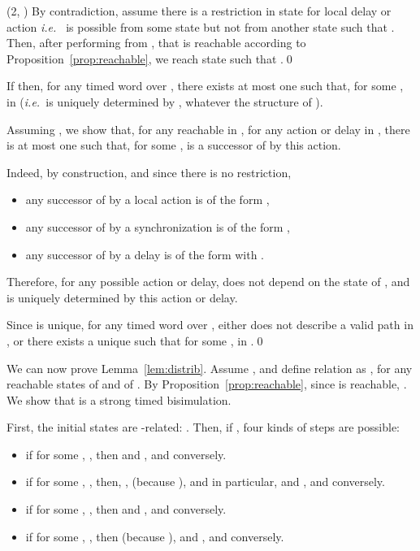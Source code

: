 \documentclass{LMCS}
\theoremstyle{plain}\newtheorem*{prop11}{Proposition~\ref{prop:states} bis}
\def\ie{{\em i.e.\ }}
\begin{document}
  (2, ) By contradiction, assume there is a restriction in state  for
  local delay or action  \ie
   is possible from some state  but not from another state
   such that . Then, after performing  from
  , that is reachable according to
  Proposition~\ref{prop:reachable}, we reach state  such
  that .\qed

\begin{prop}\label{prop:uniqueness}
  If  then,
  for any timed word  over , there exists at most one  such that, for some ,
   in 
  (\ie  is uniquely determined by , whatever the structure of
  ).
\end{prop}
\proof Assuming , we show that, for any  reachable
in , for any action or delay in
,
there is at most one  such that, for some ,  is a
successor of  by this action.

Indeed, by construction, and since there is no restriction,
\begin{itemize}
  \item any successor of  by a local action is of the form
  ,
  \item any successor of  by a synchronization  is
  of the form ,
  \item any successor of  by a delay  is
  of the form  with .
\end{itemize}
Therefore, for any possible action or delay,  does not depend on the
state of , and is uniquely determined by this action or delay.

Since  is unique, for any timed word  over
, either  does not
describe a valid path in , or there exists a unique 
such that for some ,
 in .\qed

We can now prove Lemma~\ref{lem:distrib}.
  Assume , and define relation
   as ,
  for any reachable states
   of  and
   of .
  By Proposition~\ref{prop:reachable}, since 
  is reachable, .
We show that  is a strong timed bisimulation.

  First, the initial states
  are -related: .
  Then, if , four kinds of steps are possible:
  \begin{itemize}
    \item if for some ,
    , then
     and ,
    and conversely.
    \item if for some ,
    , then, ,
     (because ),
    and in particular,  and
    , and conversely.
    \item if for some ,
    , then
     and ,
    and conversely.
    \item if for some ,
    , then
     (because ),
    and , and conversely.
  \end{itemize}
\end{document}

